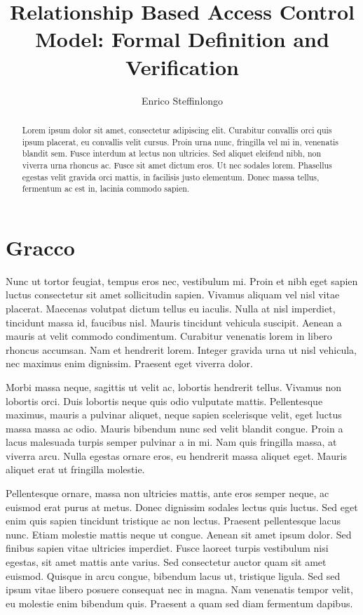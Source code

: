 \documentclass[10pt,a4paper]{article}
\author{Enrico Steffinlongo}
\title{Relationship Based Access Control Model: Formal Definition and Verification}
\begin{document}
\maketitle

\begin{abstract}
Lorem ipsum dolor sit amet, consectetur adipiscing elit. Curabitur convallis orci quis ipsum placerat, eu convallis velit cursus. Proin urna nunc, fringilla vel mi in, venenatis blandit sem. Fusce interdum at lectus non ultricies. Sed aliquet eleifend nibh, non viverra urna rhoncus ac. Fusce sit amet dictum eros. Ut nec sodales lorem. Phasellus egestas velit gravida orci mattis, in facilisis justo elementum. Donec massa tellus, fermentum ac est in, lacinia commodo sapien.
\end{abstract}

\section{Gracco}
Nunc ut tortor feugiat, tempus eros nec, vestibulum mi. Proin et nibh eget sapien luctus consectetur sit amet sollicitudin sapien. Vivamus aliquam vel nisl vitae placerat. Maecenas volutpat dictum tellus eu iaculis. Nulla at nisl imperdiet, tincidunt massa id, faucibus nisl. Mauris tincidunt vehicula suscipit. Aenean a mauris at velit commodo condimentum. Curabitur venenatis lorem in libero rhoncus accumsan. Nam et hendrerit lorem. Integer gravida urna ut nisl vehicula, nec maximus enim dignissim. Praesent eget viverra dolor.

Morbi massa neque, sagittis ut velit ac, lobortis hendrerit tellus. Vivamus non lobortis orci. Duis lobortis neque quis odio vulputate mattis. Pellentesque maximus, mauris a pulvinar aliquet, neque sapien scelerisque velit, eget luctus massa massa ac odio. Mauris bibendum nunc sed velit blandit congue. Proin a lacus malesuada turpis semper pulvinar a in mi. Nam quis fringilla massa, at viverra arcu. Nulla egestas ornare eros, eu hendrerit massa aliquet eget. Mauris aliquet erat ut fringilla molestie.

Pellentesque ornare, massa non ultricies mattis, ante eros semper neque, ac euismod erat purus at metus. Donec dignissim sodales lectus quis luctus. Sed eget enim quis sapien tincidunt tristique ac non lectus. Praesent pellentesque lacus nunc. Etiam molestie mattis neque ut congue. Aenean sit amet ipsum dolor. Sed finibus sapien vitae ultricies imperdiet. Fusce laoreet turpis vestibulum nisi egestas, sit amet mattis ante varius. Sed consectetur auctor quam sit amet euismod. Quisque in arcu congue, bibendum lacus ut, tristique ligula. Sed sed ipsum vitae libero posuere consequat nec in magna. Nam venenatis tempor velit, eu molestie enim bibendum quis. Praesent a quam sed diam fermentum dapibus.
\end{document}
